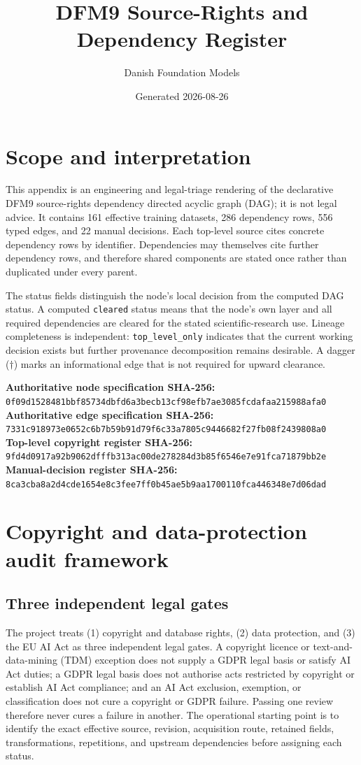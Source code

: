 \documentclass[9pt,a4paper]{article}
\title{DFM9 Source-Rights and Dependency Register}
\author{Danish Foundation Models}
\date{Generated 2026-08-26}
\begin{document}
\maketitle
\section*{Scope and interpretation}
This appendix is an engineering and legal-triage rendering of the declarative DFM9 source-rights dependency directed acyclic graph (DAG); it is not legal advice. It contains 161 effective training datasets, 286 dependency rows, 556 typed edges, and 22 manual decisions. Each top-level source cites concrete dependency rows by identifier. Dependencies may themselves cite further dependency rows, and therefore shared components are stated once rather than duplicated under every parent.

The status fields distinguish the node's local decision from the computed DAG status. A computed \texttt{cleared} status means that the node's own layer and all required dependencies are cleared for the stated scientific-research use. Lineage completeness is independent: \texttt{top\_level\_only} indicates that the current working decision exists but further provenance decomposition remains desirable. A dagger ($\dagger$) marks an informational edge that is not required for upward clearance.

\noindent\textbf{Authoritative node specification SHA-256:} \nolinkurl{0f09d1528481bbf85734dbfd6a3becb13cf98efb7ae3085fcdafaa215988afa0}\\
\textbf{Authoritative edge specification SHA-256:} \nolinkurl{7331c918973e0652c6b7b59b91d79f6c33a7805c9446682f27fb08f2439808a0}\\
\textbf{Top-level copyright register SHA-256:} \nolinkurl{9fd4d0917a92b9062dfffb313ac00de278284d3b85f6546e7e91fca71879bb2e}\\
\textbf{Manual-decision register SHA-256:} \nolinkurl{8ca3cba8a2d4cde1654e8c3fee7ff0b45ae5b9aa1700110fca446348e7d06dad}
\section{Copyright and data-protection audit framework}
\subsection{Three independent legal gates}
The project treats (1) copyright and database rights, (2) data protection, and (3) the EU AI Act as three independent legal gates. A copyright licence or text-and-data-mining (TDM) exception does not supply a GDPR legal basis or satisfy AI Act duties; a GDPR legal basis does not authorise acts restricted by copyright or establish AI Act compliance; and an AI Act exclusion, exemption, or classification does not cure a copyright or GDPR failure. Passing one review therefore never cures a failure in another. The operational starting point is to identify the exact effective source, revision, acquisition route, retained fields, transformations, repetitions, and upstream dependencies before assigning each status.
\end{document}
